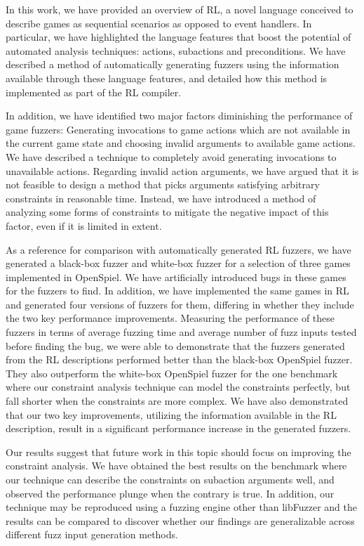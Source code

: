 In this work, we have provided an overview of RL, a novel language conceived to describe games as sequential scenarios as opposed to event handlers.
In particular, we have highlighted the language features that boost the potential of automated analysis techniques: actions, subactions and preconditions.
We have described a method of automatically generating fuzzers using the information available through these language features, and detailed how this method is implemented as part of the RL compiler.

In addition, we have identified two major factors diminishing the performance of game fuzzers: Generating invocations to game actions which are not available in the current game state and 
    choosing invalid arguments to available game actions.
We have described a technique to completely avoid generating invocations to unavailable actions.
Regarding invalid action arguments, we have argued that it is not feasible to design a method that picks arguments satisfying arbitrary constraints in reasonable time.
Instead, we have introduced a method of analyzing some forms of constraints to mitigate the negative impact of this factor, even if it is limited in extent.

As a reference for comparison with automatically generated RL fuzzers, we have generated a black-box fuzzer and white-box fuzzer for a selection of three games implemented in OpenSpiel.
We have artificially introduced bugs in these games for the fuzzers to find.
In addition, we have implemented the same games in RL and generated four versions of fuzzers for them, differing in whether they include the two key performance improvements.
Measuring the performance of these fuzzers in terms of average fuzzing time and average number of fuzz inputs tested before finding the bug, we were able to demonstrate that the fuzzers generated from the RL descriptions performed better than the black-box OpenSpiel fuzzer.
They also outperform the white-box OpenSpiel fuzzer for the one benchmark where our constraint analysis technique can model the constraints perfectly, but fall shorter when the constraints are more complex.
We have also demonstrated that our two key improvements, utilizing the information available in the RL description, result in a significant performance increase in the generated fuzzers.

Our results suggest that future work in this topic should focus on improving the constraint analysis.
We have obtained the best results on the benchmark where our technique can describe the constraints on subaction arguments well, and observed the performance plunge when the contrary is true.
In addition, our technique may be reproduced using a fuzzing engine other than libFuzzer and the results can be compared to discover whether our findings are generalizable across different fuzz input generation methods.

